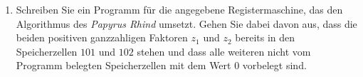 \documentclass{lehramt-informatik-aufgabe}
\begin{document}
\begin{enumerate}
\item Schreiben Sie ein Programm für die angegebene Registermaschine,
das den Algorithmus des \emph{Papyrus Rhind} umsetzt. Gehen Sie dabei
davon aus, dass die beiden positiven ganzzahligen Faktoren $z_1$ und
$z_2$ bereits in den Speicherzellen $101$ und $102$ stehen und dass alle
weiteren nicht vom Programm belegten Speicherzellen mit dem Wert $0$
vorbelegt sind.



\end{enumerate}
\end{document}
